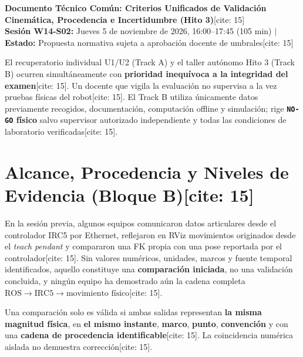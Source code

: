 \documentclass[10pt, a4paper]{article}
\begin{document}
\begin{center}
    \Large\textbf{\textcolor{ucbblue}{Documento Técnico Común: Criterios Unificados de Validación Cinemática, Procedencia e Incertidumbre (Hito 3)}}[cite: 15]\\[0.15cm]
    \footnotesize\textbf{Sesión W14-S02:} Jueves 5 de noviembre de 2026, 16:00–17:45 (105 min) $\mid$ \textbf{Estado:} Propuesta normativa sujeta a aprobación docente de umbrales[cite: 15]
\end{center}

\begin{tcolorbox}[colback=red!5, colframe=red!80!black, title=\textbf{Regla Operativa y Prioridad de la Sesión W14-S02} {[cite: 15]}, left=2mm, right=2mm, top=1mm, bottom=1mm]
    \footnotesize\raggedright
    El recuperatorio individual U1/U2 (Track A) y el taller autónomo Hito 3 (Track B) ocurren simultáneamente con \textbf{prioridad inequívoca a la integridad del examen}[cite: 15]. Un docente que vigila la evaluación no supervisa a la vez pruebas físicas del robot[cite: 15]. El Track B utiliza únicamente datos previamente recogidos, documentación, computación offline y simulación; rige \textbf{\texttt{NO-GO} físico} salvo supervisor autorizado independiente y todas las condiciones de laboratorio verificadas[cite: 15].
\end{tcolorbox}

\section{Alcance, Procedencia y Niveles de Evidencia (Bloque B)[cite: 15]}
En la sesión previa, algunos equipos comunicaron datos articulares desde el controlador IRC5 por Ethernet, reflejaron en RViz movimientos originados desde el \textit{teach pendant} y compararon una FK propia con una pose reportada por el controlador[cite: 15]. Sin valores numéricos, unidades, marcos y fuente temporal identificados, aquello constituye una \textbf{comparación iniciada}, no una validación concluida, y ningún equipo ha demostrado aún la cadena completa $\text{ROS} \to \text{IRC5} \to \text{movimiento físico}$[cite: 15].

Una comparación solo es válida si ambas salidas representan \textbf{la misma magnitud física}, en \textbf{el mismo instante}, \textbf{marco}, \textbf{punto}, \textbf{convención} y con una \textbf{cadena de procedencia identificable}[cite: 15]. La coincidencia numérica aislada no demuestra corrección[cite: 15].
\end{document}
